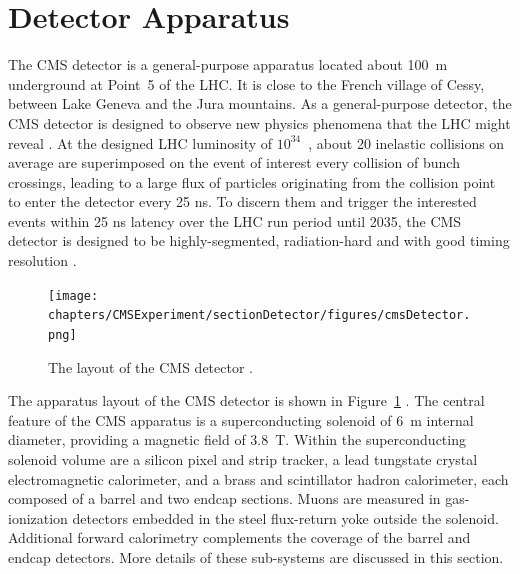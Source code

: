 

\section{Detector Apparatus}
\label{sec:cmsexperiment:detector}



The CMS \cite{exhep:cms:Chatrchyan:2008aa} detector is a general-purpose apparatus located about 100~m underground at Point~5 of the LHC. It is close to the French village of Cessy, between Lake Geneva and the Jura mountains. As a general-purpose detector, the CMS detector is designed to observe new physics phenomena that the LHC might reveal \cite{cms:tdr2:Ball:2007zza}. At the designed LHC luminosity of $10^{34}$~\percms, about 20 inelastic collisions on average are superimposed on the event of interest every collision of bunch crossings, leading to a large flux of particles originating from the collision point to enter the detector every 25 ns. To discern them and trigger the interested events within 25 ns latency over the LHC run period until 2035, the CMS detector is designed to be highly-segmented, radiation-hard and with good timing resolution \cite{exhep:cms:Chatrchyan:2008aa}.

\begin{figure}[ht]
    \centering
    \texttt{[image: chapters/CMSExperiment/sectionDetector/figures/cmsDetector.png]}
    \caption{The layout of the CMS detector \cite{cms:detectorOverview}.}
    \label{fig:cmsexperiment:detector:detectorOverview}
\end{figure}

The apparatus layout of the CMS detector is shown in Figure~\ref{fig:cmsexperiment:detector:detectorOverview} \cite{cms:detectorOverview}. The central feature of the CMS apparatus is a superconducting solenoid of 6~m internal diameter, providing a magnetic field of 3.8~T. Within the superconducting solenoid volume are a silicon pixel and strip tracker, a lead tungstate crystal electromagnetic calorimeter, and a brass and scintillator hadron calorimeter, each composed of a barrel and two endcap sections. Muons are measured in gas-ionization detectors embedded in the steel flux-return yoke outside the solenoid. Additional forward calorimetry complements the coverage of the barrel and endcap detectors. More details of these sub-systems are discussed in this section. 


